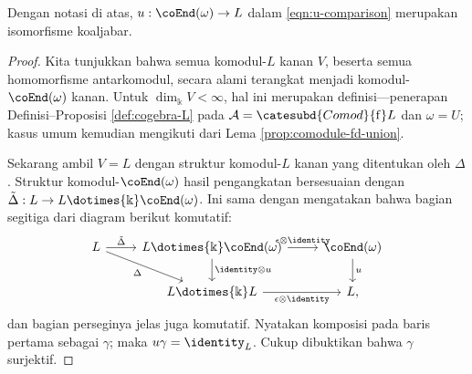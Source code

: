 \begin{lemma}\label{prop:reconstruction-cat-aux}
	Dengan notasi di atas, $u: \coEnd(\omega) \to L$ dalam
	\eqref{eqn:u-comparison} merupakan isomorfisme koaljabar.
\end{lemma}
\begin{proof}
	Kita tunjukkan bahwa semua komodul-$L$ kanan $V$, beserta semua
	homomorfisme antarkomodul, secara alami terangkat menjadi
	komodul-$\coEnd(\omega)$ kanan. Untuk $\dim_{\Bbbk} V < \infty$, hal ini
	merupakan definisi---penerapan Definisi--Proposisi
	\ref{def:cogebra-L} pada
	$\mathcal{A} = \catesubd{Comod}{\mathrm{f}}L$ dan $\omega = U$;
	kasus umum kemudian mengikuti dari Lema
	\ref{prop:comodule-fd-union}.
	
	Sekarang ambil $V=L$ dengan struktur komodul-$L$ kanan yang ditentukan
	oleh $\Delta$. Struktur komodul-$\coEnd(\omega)$ hasil pengangkatan
	bersesuaian dengan
	$\tilde{\Delta}: L \to L \dotimes{\Bbbk} \coEnd(\omega)$. Ini sama
	dengan mengatakan bahwa bagian segitiga dari diagram berikut komutatif:
	\[\begin{tikzcd}
		L \arrow[r, "{\tilde{\Delta}}"] \arrow[rd, "\Delta"'] & L \dotimes{\Bbbk} \coEnd(\omega) \arrow[r, "{\epsilon \otimes \identity}"] \arrow[d, "{\identity \otimes u}"] & \coEnd(\omega) \arrow[d, "u"] \\
		& L \dotimes{\Bbbk} L \arrow[r, "{\epsilon \otimes \identity}"'] & L,
	\end{tikzcd}\]
	dan bagian perseginya jelas juga komutatif. Nyatakan komposisi pada baris
	pertama sebagai $\gamma$; maka $u\gamma = \identity_L$. Cukup dibuktikan
	bahwa $\gamma$ surjektif.
	

\end{proof}
